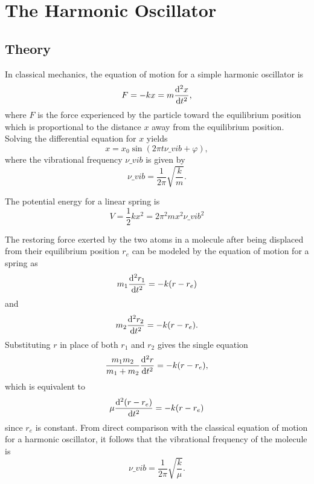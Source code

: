 \section{The Harmonic Oscillator}
\label{s:the_harmonic_oscillator}

\subsection{Theory}

In classical mechanics, the equation of motion for a simple harmonic oscillator is
\begin{equation*}
    F = -kx = m\odv[2]{x}{t},
\end{equation*}
where $F$ is the force experienced by the particle toward the equilibrium position which is proportional to the distance $x$ away from the equilibrium position. Solving the differential equation for $x$ yields
\begin{equation*}
    x = x_0\sin(2\pi t\nu\_{vib} + \varphi),
\end{equation*}
where the vibrational frequency $\nu\_{vib}$ is given by
\begin{equation*}
    \nu\_{vib} = \frac{1}{2\pi}\sqrt{\frac{k}{m}}.
\end{equation*}

The potential energy for a linear spring is
\begin{equation*}
    V = \frac{1}{2}kx^2 = 2\pi^2mx^2\nu\_{vib}^2
\end{equation*}

The restoring force exerted by the two atoms in a molecule after being displaced from their equilibrium position $r_e$ can be modeled by the equation of motion for a spring as
\begin{equation*}
    m_1\odv[2]{r_1}{t} = -k(r - r_e)
\end{equation*}
and
\begin{equation*}
    m_2\odv[2]{r_2}{t} = -k(r - r_e).
\end{equation*}
Substituting $r$ in place of both $r_1$ and $r_2$ gives the single equation
\begin{equation*}
    \frac{m_1m_2}{m_1 + m_2}\odv[2]{r}{t} = -k(r - r_e),
\end{equation*}
which is equivalent to
\begin{equation*}
    \mu\odv[2]{(r - r_e)}{t} = -k(r - r_e)
\end{equation*}
since $r_e$ is constant. From direct comparison with the classical equation of motion for a harmonic oscillator, it follows that the vibrational frequency of the molecule is
\begin{equation*}
    \nu\_{vib} = \frac{1}{2\pi}\sqrt{\frac{k}{\mu}}.
\end{equation*}

